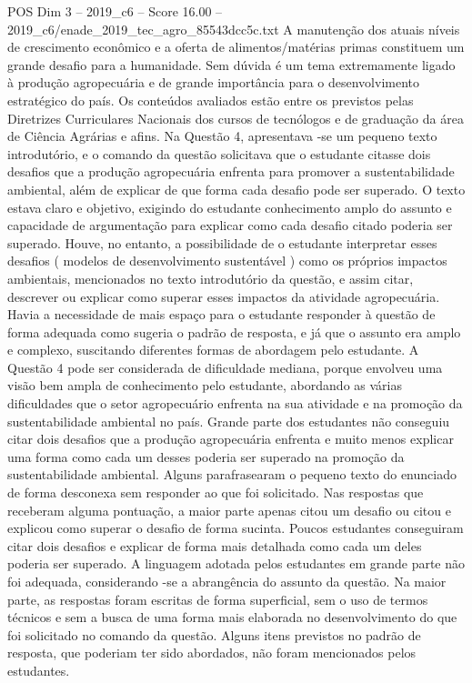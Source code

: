 \begin{textsample}{POS Dim 3 – 2019\_c6 – Score 16.00 – 2019\_c6/enade\_2019\_tec\_agro\_85543dcc5c.txt}
A manutenção dos atuais níveis de crescimento econômico e a oferta de alimentos/matérias primas constituem um grande desafio para a humanidade.
Sem dúvida é um tema extremamente ligado à produção agropecuária e de grande importância para o desenvolvimento estratégico do país.
Os conteúdos avaliados estão entre os previstos pelas Diretrizes Curriculares Nacionais dos cursos de tecnólogos e de graduação da área de Ciência Agrárias e afins.
Na Questão 4, apresentava -se um pequeno texto introdutório, e o comando da questão solicitava que o estudante citasse dois desafios que a produção agropecuária enfrenta para promover a sustentabilidade ambiental, além de explicar de que forma cada desafio pode ser superado.
O texto estava claro e objetivo, exigindo do estudante conhecimento amplo do assunto e capacidade de argumentação para explicar como cada desafio citado poderia ser superado.
Houve, no entanto, a possibilidade de o estudante interpretar esses desafios ( modelos de desenvolvimento sustentável ) como os próprios impactos ambientais, mencionados no texto introdutório da questão, e assim citar, descrever ou explicar como superar esses impactos da atividade agropecuária.
Havia a necessidade de mais espaço para o estudante responder à questão de forma adequada como sugeria o padrão de resposta, e já que o assunto era amplo e complexo, suscitando diferentes formas de abordagem pelo estudante.
A Questão 4 pode ser considerada de dificuldade mediana, porque envolveu uma visão bem ampla de conhecimento pelo estudante, abordando as várias dificuldades que o setor agropecuário enfrenta na sua atividade e na promoção da sustentabilidade ambiental no país.
Grande parte dos estudantes não conseguiu citar dois desafios que a produção agropecuária enfrenta e muito menos explicar uma forma como cada um desses poderia ser superado na promoção da sustentabilidade ambiental.
Alguns parafrasearam o pequeno texto do enunciado de forma desconexa sem responder ao que foi solicitado.
Nas respostas que receberam alguma pontuação, a maior parte apenas citou um desafio ou citou e explicou como superar o desafio de forma sucinta.
Poucos estudantes conseguiram citar dois desafios e explicar de forma mais detalhada como cada um deles poderia ser superado.
A linguagem adotada pelos estudantes em grande parte não foi adequada, considerando -se a abrangência do assunto da questão.
Na maior parte, as respostas foram escritas de forma superficial, sem o uso de termos técnicos e sem a busca de uma forma mais elaborada no desenvolvimento do que foi solicitado no comando da questão.
Alguns itens previstos no padrão de resposta, que poderiam ter sido abordados, não foram mencionados pelos estudantes.

\end{textsample}
